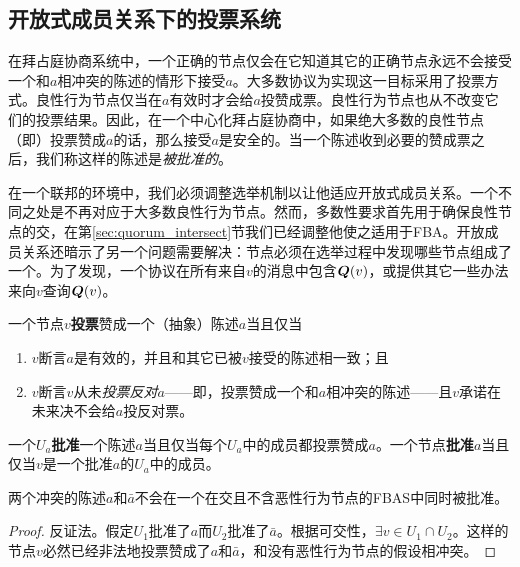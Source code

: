 \subsection{开放式成员关系下的投票系统}

在拜占庭协商系统中，一个正确的节点仅会在它知道其它的正确节点永远不会接受一个和$a$相冲突的陈述的情形下接受$a$。大多数协议为实现这一目标采用了投票方式。良性行为节点仅当在$a$有效时才会给$a$投赞成票。良性行为节点也从不改变它们的投票结果。因此，在一个中心化拜占庭协商中，如果绝大多数的良性节点（即{\quorum}）投票赞成$a$的话，那么接受$a$是安全的。当一个陈述收到必要的赞成票之后，我们称这样的陈述是\textit{被批准的}。

在一个联邦的环境中，我们必须调整选举机制以让他适应开放式成员关系。一个不同之处是{\quorum}不再对应于大多数良性行为节点。然而，多数性要求首先用于确保良性节点的{\quorum}交，在第\ref{sec:quorum_intersect}节我们已经调整他使之适用于FBA。开放成员关系还暗示了另一个问题需要解决：节点必须在选举过程中发现哪些节点组成了一个{\quorum}。为了发现{\quorum}，一个协议在所有来自$v$的消息中包含${\bm Q}(v)$，或提供其它一些办法来向$v$查询${\bm Q}(v)$。

\begin{definition}[投票]
        一个节点$v$\textbf{投票}赞成一个（抽象）陈述$a$当且仅当
        \begin{enumerate}
                \item $v$断言$a$是有效的，并且和其它已被$v$接受的陈述相一致；且
                \item $v$断言$v$从未\textit{投票反对}$a$——即，投票赞成一个和$a$相冲突的陈述——且$v$承诺在未来决不会给$a$投反对票。
        \end{enumerate}
\end{definition}

\begin{definition}[批准]
        一个{\quorum}$U_a$\textbf{批准}一个陈述$a$当且仅当每个$U_a$中的成员都投票赞成$a$。一个节点\textbf{批准}$a$当且仅当$v$是一个批准$a$的{\quorum}$U_a$中的成员。
\end{definition}

\begin{theorem}\label{thm:cannot_ratify_contradictory}
        两个冲突的陈述$a$和$\bar a$不会在一个在{\quorum}交且不含恶性行为节点的FBAS中同时被批准。
\end{theorem}

\begin{proof}
        反证法。假定{\quorum}$U_1$批准了$a$而{\quorum}$U_2$批准了$\bar a$。根据{\quorum}可交性，$\exists v\in U_1\cap U_2$。这样的节点$v$必然已经非法地投票赞成了$a$和$\bar a$，和没有恶性行为节点的假设相冲突。
\end{proof}

